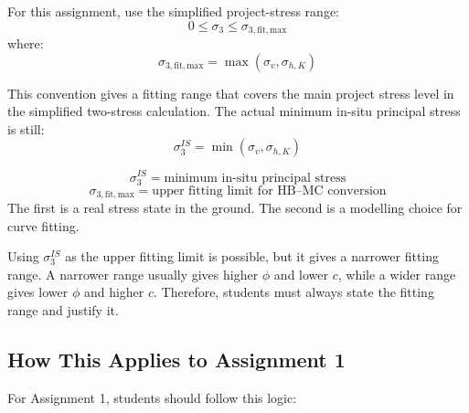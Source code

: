 \documentclass[a4paper,12pt]{article}
\begin{document}
\begin{notebox}
For this assignment, use the simplified project-stress range:
\[
0 \leq \sigma_3 \leq \sigma_{3,\mathrm{fit,max}}
\]
where:
\[
\sigma_{3,\mathrm{fit,max}}=\max(\sigma_v,\sigma_{h,K})
\]

This convention gives a fitting range that covers the main project stress level in the
simplified two-stress calculation. The actual minimum in-situ principal stress is still:
\[
\sigma_3^{IS}=\min(\sigma_v,\sigma_{h,K})
\]
\end{notebox}

\begin{keybox}
\[
\sigma_3^{IS}=\text{minimum in-situ principal stress}
\]
\[
\sigma_{3,\mathrm{fit,max}}=\text{upper fitting limit for HB--MC conversion}
\]
The first is a real stress state in the ground. The second is a modelling choice for
curve fitting.
\end{keybox}

\begin{warnbox}
Using \(\sigma_3^{IS}\) as the upper fitting limit is possible, but it gives a narrower
fitting range. A narrower range usually gives higher \(\phi\) and lower \(c\), while a
wider range gives lower \(\phi\) and higher \(c\). Therefore, students must always state
the fitting range and justify it.
\end{warnbox}

\subsection{How This Applies to Assignment 1}

For Assignment 1, students should follow this logic:
\end{document}

